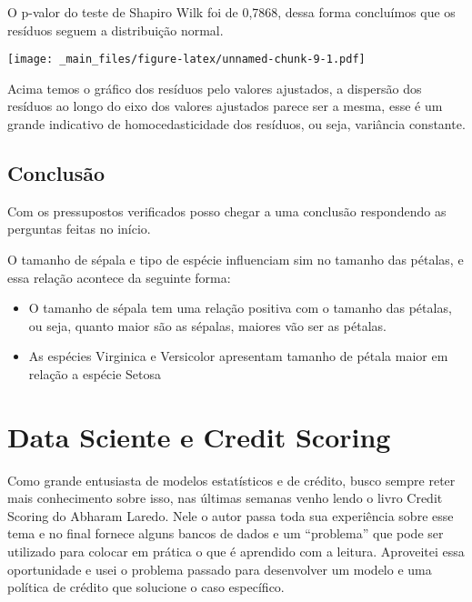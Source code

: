 \documentclass[
]{book}
\newenvironment{Shaded}{\begin{snugshade}}{\end{snugshade}}
\newcommand{\CommentTok}[1]{\textcolor[rgb]{0.56,0.35,0.01}{\textit{#1}}}
\newcommand{\FunctionTok}[1]{\textcolor[rgb]{0.00,0.00,0.00}{#1}}
\newcommand{\NormalTok}[1]{#1}
\newcommand{\SpecialCharTok}[1]{\textcolor[rgb]{0.00,0.00,0.00}{#1}}
\providecommand{\tightlist}{%
  \setlength{\itemsep}{0pt}\setlength{\parskip}{0pt}}
\begin{document}
O p-valor do teste de Shapiro Wilk foi de 0,7868, dessa forma concluímos que os resíduos seguem a distribuição normal.

\begin{Shaded}
\end{Shaded}

\texttt{[image: \_main\_files/figure-latex/unnamed-chunk-9-1.pdf]}

Acima temos o gráfico dos resíduos pelo valores ajustados, a dispersão dos resíduos ao longo do eixo dos valores ajustados parece ser a mesma, esse é um grande indicativo de homocedasticidade dos resíduos, ou seja, variância constante.

\hypertarget{conclusuxe3o}{%
\subsection{Conclusão}\label{conclusuxe3o}}

Com os pressupostos verificados posso chegar a uma conclusão respondendo as perguntas feitas no início.

O tamanho de sépala e tipo de espécie influenciam sim no tamanho das pétalas, e essa relação acontece da seguinte forma:

\begin{itemize}
\tightlist
\item
  O tamanho de sépala tem uma relação positiva com o tamanho das pétalas, ou seja, quanto maior são as sépalas, maiores vão ser as pétalas.
\item
  As espécies Virginica e Versicolor apresentam tamanho de pétala maior em relação a espécie Setosa
\end{itemize}

\hypertarget{data-sciente-e-credit-scoring}{%
\section{Data Sciente e Credit Scoring}\label{data-sciente-e-credit-scoring}}

Como grande entusiasta de modelos estatísticos e de crédito, busco sempre reter mais conhecimento sobre isso, nas últimas semanas venho lendo o livro Credit Scoring do Abharam Laredo. Nele o autor passa toda sua experiência sobre esse tema e no final fornece alguns bancos de dados e um ``problema'' que pode ser utilizado para colocar em prática o que é aprendido com a leitura. Aproveitei essa oportunidade e usei o problema passado para desenvolver um modelo e uma política de crédito que solucione o caso específico.
\end{document}

